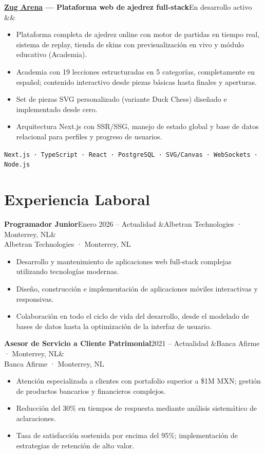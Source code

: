 \documentclass[10pt, letterpaper]{article}
\newcommand{\entry}[3]{%
  \noindent\textbf{#1}\hfill\textcolor{muted}{\small #2}%
  \ifx&#3&\else\\\textcolor{muted}{\small #3}\fi%
  \par\vspace{0.1em}%
}
\begin{document}
\entry{\href{https://zugarena.com}{Zug Arena} — Plataforma web de ajedrez full-stack}{En desarrollo activo}{}
\begin{itemize}
  \item Plataforma completa de ajedrez online con motor de partidas en tiempo real, sistema de replay,
        tienda de skins con previsualización en vivo y módulo educativo (Academia).
  \item Academia con 19 lecciones estructuradas en 5 categorías, completamente en español; contenido
        interactivo desde piezas básicas hasta finales y aperturas.
  \item Set de piezas SVG personalizado (variante Duck Chess) diseñado e implementado desde cero.
  \item Arquitectura Next.js con SSR/SSG, manejo de estado global y base de datos relacional para
        perfiles y progreso de usuarios.
\end{itemize}
\vspace{0.2em}
\textcolor{muted}{\small \texttt{Next.js · TypeScript · React · PostgreSQL · SVG/Canvas · WebSockets · Node.js}}

\section{Experiencia Laboral}

\entry{Programador Junior}{Enero 2026 – Actualidad}{Albetran Technologies · Monterrey, NL}
\begin{itemize}
  \item Desarrollo y mantenimiento de aplicaciones web full-stack complejas utilizando tecnologías modernas.
  \item Diseño, construcción e implementación de aplicaciones móviles interactivas y responsivas.
  \item Colaboración en todo el ciclo de vida del desarrollo, desde el modelado de bases de datos hasta la optimización de la interfaz de usuario.
\end{itemize}

\vspace{0.4em}

\entry{Asesor de Servicio a Cliente Patrimonial}{2021 – Actualidad}{Banca Afirme · Monterrey, NL}
\begin{itemize}
  \item Atención especializada a clientes con portafolio superior a \$1M MXN; gestión de productos bancarios y financieros complejos.
  \item Reducción del 30\% en tiempos de respuesta mediante análisis sistemático de aclaraciones.
  \item Tasa de satisfacción sostenida por encima del 95\%; implementación de estrategias de retención de alto valor.
\end{itemize}
\end{document}
